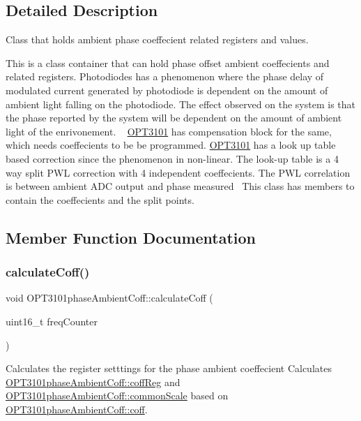 \subsection{Detailed Description}
Class that holds ambient phase coeffecient related registers and values. 

This is a class container that can hold phase offset ambient coeffecients and related registers. Photodiodes has a phenomenon where the phase delay of modulated current generated by photodiode is dependent on the amount of ambient light falling on the photodiode. The effect observed on the system is that the phase reported by the system will be dependent on the amount of ambient light of the enrivonement. ~\newline
 \mbox{\hyperlink{namespace_o_p_t3101}{O\+P\+T3101}} has compensation block for the same, which needs coeffecients to be be programmed. \mbox{\hyperlink{namespace_o_p_t3101}{O\+P\+T3101}} has a look up table based correction since the phenomenon in non-\/linear. The look-\/up table is a 4 way split P\+WL correction with 4 independent coeffecients. The P\+WL correlation is between ambient A\+DC output and phase measured~\newline
 This class has members to contain the coeffecients and the split points. 

\subsection{Member Function Documentation}
\mbox{\label{class_o_p_t3101phase_ambient_coff_a926e3a0dcadac3172c34982bbf8e1bbe}} 
\subsubsection{\texorpdfstring{calculate\+Coff()}{calculateCoff()}}
{\footnotesize\ttfamily void O\+P\+T3101phase\+Ambient\+Coff\+::calculate\+Coff (\begin{DoxyParamCaption}\item[{uint16\+\_\+t}]{freq\+Counter }\end{DoxyParamCaption})}



Calculates the register setttings for the phase ambient coeffecient Calculates \mbox{\hyperlink{class_o_p_t3101phase_ambient_coff_a7b9be6815f936c44329b53f5f57b3d6c}{O\+P\+T3101phase\+Ambient\+Coff\+::coff\+Reg}} and \mbox{\hyperlink{class_o_p_t3101phase_ambient_coff_ac2976af69df6837bd7bc1881b87f7188}{O\+P\+T3101phase\+Ambient\+Coff\+::common\+Scale}} based on \mbox{\hyperlink{class_o_p_t3101phase_ambient_coff_a0174483b15a3819cf8b30fcad00f7dda}{O\+P\+T3101phase\+Ambient\+Coff\+::coff}}. 


